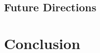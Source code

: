 \documentclass[]{rptuseminar}
\begin{document}
\subsection{Future Directions}  
\label{subsec:future}  

\section{Conclusion}  
\label{sec:conclusion}  

\newpage
\nocite{*}



\end{document}
